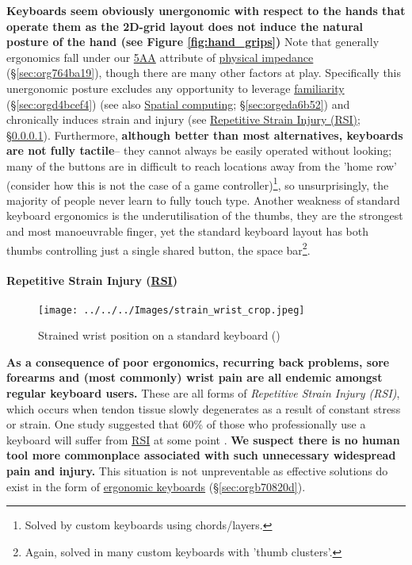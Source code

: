 \documentclass[logo,bsc,singlespacing,parskip]{infthesis}
\begin{document}
\textbf{Keyboards seem obviously unergonomic with respect to the hands that operate them as the 2D-grid layout does not induce the natural posture of the hand (see Figure \ref{fig:hand_grips})}
Note that generally ergonomics fall under our \hyperref[orgce96c46]{5AA} attribute of \hyperref[sec:org764ba19]{physical impedance} (\S \ref{sec:org764ba19}), though there are many other factors at play.
Specifically this unergonomic posture excludes any opportunity to leverage \hyperref[sec:orgd4bcef4]{familiarity} (\S \ref{sec:orgd4bcef4})
(see also \hyperref[sec:orgeda6b52]{Spatial computing}; \S \ref{sec:orgeda6b52}) and chronically induces strain and injury (see \hyperref[sec:orgb3cc9c2]{Repetitive Strain Injury (RSI)}; \S \ref{sec:orgb3cc9c2}).
Furthermore, \textbf{although better than most alternatives, keyboards are not fully tactile}-- they cannot always be easily operated without looking; many of the buttons are in difficult to reach locations away from the 'home row' (consider how this is not the case of a game controller)\footnote{Solved by custom keyboards using chords/layers.}, so unsurprisingly, the majority of people never learn to fully touch type.
Another weakness of standard keyboard ergonomics is the underutilisation of the thumbs,  they are the strongest and most manoeuvrable finger, yet the standard keyboard layout has both thumbs controlling just a single shared button, the space bar\footnote{Again, solved in many custom keyboards with 'thumb clusters'.}.

\paragraph{Repetitive Strain Injury (\hyperref[orgafdb7af]{RSI})}
\label{sec:orgb3cc9c2}
\begin{figure}[h]
\centering
\texttt{[image: ../../../Images/strain\_wrist\_crop.jpeg]}
\caption{Strained wrist position on a standard keyboard (\autocite{ZergoFreedomErgonomics})}
\end{figure}

\textbf{As a consequence of  poor ergonomics, recurring back problems, sore forearms and (most commonly) wrist pain are all endemic amongst regular keyboard users.}
These are all forms of \emph{Repetitive Strain Injury (\label{orgafdb7af}RSI)}, which   occurs when tendon tissue slowly degenerates as a result of constant stress or strain.
One study suggested that 60\% of those who professionally use a keyboard will suffer from \hyperref[orgafdb7af]{RSI} at some point \autocite{namayandegiEVALUATIONMETHODWHICH2015}.
\textbf{We suspect there is no human tool more commonplace associated with such unnecessary widespread pain and injury.}
This situation is not unpreventable as effective solutions do exist in the form of \hyperref[sec:orgb70820d]{ergonomic keyboards} (\S \ref{sec:orgb70820d}).
\end{document}
